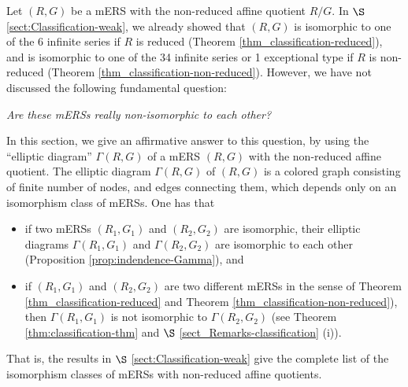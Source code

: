 \documentclass[11pt]{amsart}
\begin{document}
 {Let $(R,G)$ be a mERS with the non-reduced affine quotient $R/G$.  
In $\S$ \ref{sect:Classification-weak},  we already showed that $(R,G)$ is isomorphic to 
one of the 6 infinite series 
if $R$ is reduced 
(Theorem \ref{thm_classification-reduced}), and
is isomorphic to one of the 34 infinite series 
or 1 exceptional type if $R$ is 
non-reduced (Theorem 
\ref{thm_classification-non-reduced}). However, we have not {discussed}
the following fundamental question:
\begin{center}
{\it Are these 
mERSs really non-isomorphic to each other?}
\end{center}
In this section, we give an affirmative
answer to
this question, by using the 
``elliptic diagram'' $\Gamma(R,G)$ of a mERS $(R,G)$ with the non-reduced 
affine quotient. The elliptic diagram $\Gamma(R,G)$ of $(R,G)$ is a 
colored graph consisting of finite number of nodes, and edges connecting them, which
depends only on an isomorphism class of mERSs. One has that 
\begin{itemize}
\item if two mERSs $(R_1,G_1)$ and $(R_2,G_2)$ are isomorphic, their elliptic diagrams 
$\Gamma(R_1,G_1)$ and $\Gamma(R_2,G_2)$ are isomorphic to each other
(Proposition \ref{prop:indendence-Gamma}), and 
\vskip 1mm
\item if $(R_1,G_1)$ and $(R_2,G_2)$ are two different mERSs in the sense of 
Theorem \ref{thm_classification-reduced} and Theorem 
\ref{thm_classification-non-reduced}), then $\Gamma(R_1,G_1)$
is not isomorphic to $\Gamma(R_2,G_2)$ (see Theorem \ref{thm:classification-thm}
and $\S$ \ref{sect_Remarks-classification} (i)).
\end{itemize}
That is, the results in $\S$ \ref{sect:Classification-weak} give the complete list of the 
isomorphism classes of mERSs with non-reduced affine quotients.
\vskip 3mm

}
\end{document}
